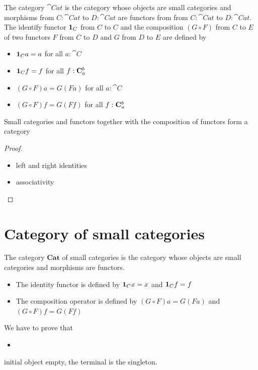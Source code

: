\documentclass[12pt]{article}
\begin{document}
The category \(\cat{Cat}\) is the category whose objects are small categories
and morphisms from \(C:\cat{Cat}\) to \(D:\cat{Cat}\) are functors from
from \(C:\cat{Cat}\) to \(D:\cat{Cat}\).
The identify functor \(\idarrow[C]\) from \(C\) to \(C\) and the composition
\((G \circ F)\) from \(C\) to \(E\) of two functors \(F\) from \(C\) to \(D\) and \(G\) from \(D\) to \(E\) are defined by
\begin{itemize}
    \item \(\idarrow[C] a = a\) for all \(a : \cat{C}\)
    \item \(\idarrow[C] f = f\) for all \(f : \morphs{C}{a}{b}\)
    \item \((G \circ F) a = G (F a)\) for all \(a : \cat{C}\) 
    \item \((G \circ F) f = G (F f)\) for all \(f : \morphs{C}{a}{b}\)
\end{itemize}

\begin{proposition}
    Small categories and functors together with the composition of functors 
    form a category
\end{proposition}
\begin{proof}
\begin{itemize}
    \item left and right identities 
    \item associativity
\end{itemize}
\end{proof}

\section{Category of small categories}

The category \(\mathbf{Cat}\) of small categories is the category whose objects are small categories
and morphisms are functors.

\begin{itemize}
    \item The identity functor is defined by \(\idarrow[C] x = x\) and \(\idarrow[C] f = f\)
    \item The composition operator is defined by \((G \circ F) a = G(F a)\) and \((G \circ F) f = G(F f)\)
\end{itemize}
We have to prove that 
\begin{itemize}
    \item 
\end{itemize}

initial object empty, the terminal is the singleton.
\end{document}
